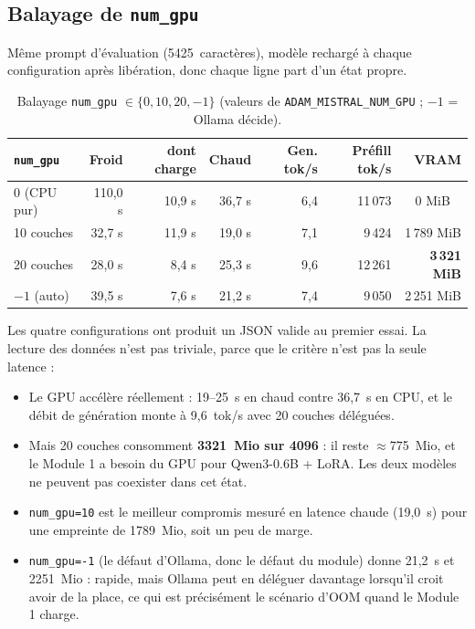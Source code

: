 \subsection{Balayage de \texttt{num\_gpu}}
\label{sec:perf-numgpu}

Même prompt d'évaluation (5425~caractères), modèle rechargé à chaque
configuration après libération, donc chaque ligne part d'un état propre.

\begin{small}
\begin{table}[H]
\centering
\caption{Balayage \texttt{num\_gpu} $\in \{0, 10, 20, -1\}$ (valeurs de
\texttt{ADAM\_MISTRAL\_NUM\_GPU} ; $-1$ = Ollama décide).}
\label{tab:numgpu}
\begin{tabular}{@{}l r r r r r r@{}}
\toprule
\textbf{\texttt{num\_gpu}} & \textbf{Froid} & \textbf{dont charge} & \textbf{Chaud} & \textbf{Gen. tok/s} & \textbf{Préfill tok/s} & \textbf{VRAM} \\
\midrule
0 (CPU pur)   & 110,0 s & 10,9 s & 36,7 s & 6,4  & 11\,073 & \multicolumn{1}{c}{0 MiB} \\
10 couches    & 32,7 s  & 11,9 s & 19,0 s & 7,1  & 9\,424  & 1\,789 MiB \\
20 couches    & 28,0 s  & 8,4 s  & 25,3 s & 9,6  & 12\,261 & \textbf{3\,321 MiB} \\
$-1$ (auto)   & 39,5 s  & 7,6 s  & 21,2 s & 7,4  & 9\,050  & 2\,251 MiB \\
\bottomrule
\end{tabular}
\end{table}
\end{small}

Les quatre configurations ont produit un JSON valide au premier essai. La
lecture des données n'est pas triviale, parce que le critère n'est pas la seule
latence :

\begin{itemize}[itemsep=2pt]
  \item Le GPU accélère réellement : 19--25~s en chaud contre 36,7~s en CPU, et
        le débit de génération monte à 9,6~tok/s avec 20 couches déléguées.
  \item Mais 20 couches consomment \textbf{3321~Mio sur 4096} : il reste
        $\approx$775~Mio, et le Module 1 a besoin du GPU pour Qwen3-0.6B + LoRA.
        Les deux modèles ne peuvent pas coexister dans cet état.
  \item \texttt{num\_gpu=10} est le meilleur compromis mesuré en latence chaude
        (19,0~s) pour une empreinte de 1789~Mio, soit un peu de marge.
  \item \texttt{num\_gpu=-1} (le défaut d'Ollama, donc le défaut du module)
        donne 21,2~s et 2251~Mio : rapide, mais Ollama peut en déléguer davantage
        lorsqu'il croit avoir de la place, ce qui est précisément le scénario
        d'OOM quand le Module 1 charge.
\end{itemize}

